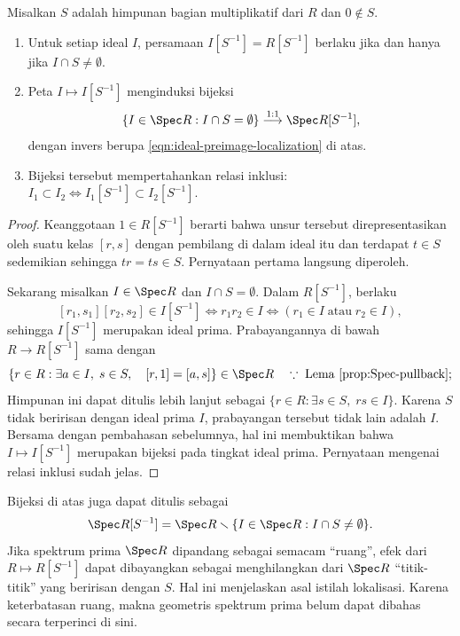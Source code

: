 \begin{proposition}\label{prop:localization-ideals}
	Misalkan $S$ adalah himpunan bagian multiplikatif dari $R$ dan $0 \notin S$.
	\begin{enumerate}
		\item Untuk setiap ideal $I$, persamaan $I[S^{-1}] = R[S^{-1}]$ berlaku jika dan hanya jika $I \cap S \neq \emptyset$.
		\item Peta $I \mapsto I[S^{-1}]$ menginduksi bijeksi
			\[ \{I \in \Spec R : I \cap S = \emptyset \} \stackrel{1:1}{\longrightarrow} \Spec R[S^{-1}], \]
			dengan invers berupa \eqref{eqn:ideal-preimage-localization} di atas.
		\item Bijeksi tersebut mempertahankan relasi inklusi: $I_1 \subset I_2 \iff I_1[S^{-1}] \subset I_2[S^{-1}]$.
	\end{enumerate}
\end{proposition}
\begin{proof}
	Keanggotaan $1 \in R[S^{-1}]$ berarti bahwa unsur tersebut direpresentasikan oleh suatu kelas $[r, s]$ dengan pembilang di dalam ideal itu dan terdapat $t \in S$ sedemikian sehingga $tr = ts \in S$. Pernyataan pertama langsung diperoleh.

	Sekarang misalkan $I \in \Spec R$ dan $I \cap S = \emptyset$. Dalam $R[S^{-1}]$, berlaku
	\[ [r_1, s_1] [r_2, s_2] \in I[S^{-1}] \iff r_1 r_2 \in I \iff \left( r_1 \in I \; \text{atau} \; r_2 \in I \right), \]
	sehingga $I[S^{-1}]$ merupakan ideal prima. Prabayangannya di bawah $R \to R[S^{-1}]$ sama dengan
	\[ \{r \in R : \exists a \in I, \; s \in S, \quad [r, 1] = [a, s] \} \in \Spec R \quad \because\;\text{Lema \ref{prop:Spec-pullback}}; \]
	Himpunan ini dapat ditulis lebih lanjut sebagai $\{ r \in R : \exists s \in S, \; rs \in I \}$. Karena $S$ tidak beririsan dengan ideal prima $I$, prabayangan tersebut tidak lain adalah $I$. Bersama dengan pembahasan sebelumnya, hal ini membuktikan bahwa $I \mapsto I[S^{-1}]$ merupakan bijeksi pada tingkat ideal prima. Pernyataan mengenai relasi inklusi sudah jelas.
\end{proof}

Bijeksi di atas juga dapat ditulis sebagai
\[ \Spec R[S^{-1}] = \Spec R \smallsetminus \{I \in \Spec R : I \cap S \neq \emptyset \}. \]
Jika spektrum prima $\Spec R$ dipandang sebagai semacam ``ruang'', efek dari $R \mapsto R[S^{-1}]$ dapat dibayangkan sebagai menghilangkan dari $\Spec R$ ``titik-titik'' yang beririsan dengan $S$. Hal ini menjelaskan asal istilah lokalisasi. Karena keterbatasan ruang, makna geometris spektrum prima belum dapat dibahas secara terperinci di sini.

